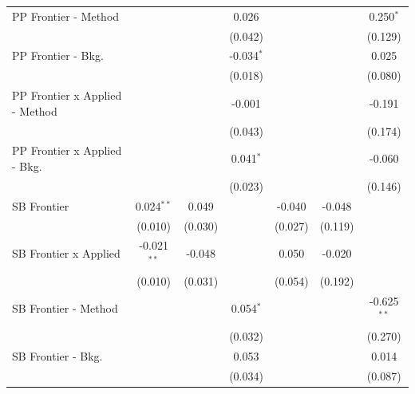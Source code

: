 \begin{tabular}{lcccccc}
   PP Frontier - Method           &               &              & 0.026        &               &               & 0.250$^{*}$\\   
                                  &               &              & (0.042)      &               &               & (0.129)\\   
   PP Frontier - Bkg.             &               &              & -0.034$^{*}$ &               &               & 0.025\\   
                                  &               &              & (0.018)      &               &               & (0.080)\\   
   PP Frontier x Applied - Method &               &              & -0.001       &               &               & -0.191\\   
                                  &               &              & (0.043)      &               &               & (0.174)\\   
   PP Frontier x Applied - Bkg.   &               &              & 0.041$^{*}$  &               &               & -0.060\\   
                                  &               &              & (0.023)      &               &               & (0.146)\\   
   SB Frontier                    & 0.024$^{**}$  & 0.049        &              & -0.040        & -0.048        &   \\   
                                  & (0.010)       & (0.030)      &              & (0.027)       & (0.119)       &   \\   
   SB Frontier x Applied          & -0.021$^{**}$ & -0.048       &              & 0.050         & -0.020        &   \\   
                                  & (0.010)       & (0.031)      &              & (0.054)       & (0.192)       &   \\   
   SB Frontier - Method           &               &              & 0.054$^{*}$  &               &               & -0.625$^{**}$\\   
                                  &               &              & (0.032)      &               &               & (0.270)\\   
   SB Frontier - Bkg.             &               &              & 0.053        &               &               & 0.014\\   
                                  &               &              & (0.034)      &               &               & (0.087)\\   

\end{tabular}
